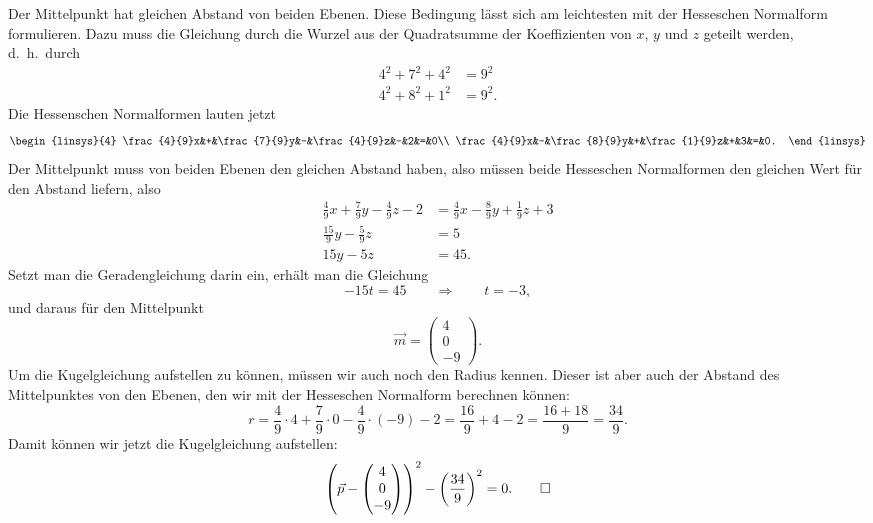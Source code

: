 \begin{loesung}
Der Mittelpunkt hat gleichen Abstand von beiden Ebenen. 
Diese Bedingung lässt sich am leichtesten mit der Hesseschen Normalform
formulieren.
Dazu muss die Gleichung durch die Wurzel aus der Quadratsumme der
Koeffizienten von $x$, $y$ und $z$ geteilt werden, d.~h.~durch
\begin{align*}
4^2+7^2+4^2&=9^2\\
4^2+8^2+1^2&=9^2.
\end{align*}
Die Hessenschen Normalformen lauten jetzt
\[
\begin{linsys}{4}
\frac{4}{9}x&+&\frac{7}{9}y&-&\frac{4}{9}z&-&2&=&0\\
\frac{4}{9}x&-&\frac{8}{9}y&+&\frac{1}{9}z&+&3&=&0.
\end{linsys}
\]
Der Mittelpunkt muss von beiden Ebenen den gleichen Abstand haben,
also müssen beide Hesseschen Normalformen den gleichen Wert für den Abstand
liefern, also
\begin{align*}
\frac{4}{9}x+\frac{7}{9}y-\frac{4}{9}z-2&=
\frac{4}{9}x-\frac{8}{9}y+\frac{1}{9}z+3
\\
\frac{15}{9}y-\frac{5}{9}z&=5
\\
15y-5z&=45.
\end{align*}
Setzt man die Geradengleichung darin ein, erhält man die Gleichung
\[
-15t=45
\qquad\Rightarrow\qquad t=-3,
\]
und daraus für den Mittelpunkt
\[
\vec m=\begin{pmatrix}4\\0\\-9\end{pmatrix}.
\]
Um die Kugelgleichung aufstellen zu können, müssen wir auch noch den
Radius kennen.
Dieser ist aber auch der Abstand des Mittelpunktes von den Ebenen,
den wir mit der Hesseschen Normalform berechnen können:
\[
r
=
\frac{4}{9}\cdot 4+\frac{7}{9}\cdot 0-\frac{4}{9}\cdot (-9)-2
=
\frac{16}{9}+4-2
=
\frac{16+18}{9}
=
\frac{34}{9}.
\]
Damit können wir jetzt die Kugelgleichung aufstellen:
\[
\left(
\vec p - \begin{pmatrix}4\\0\\-9\end{pmatrix}
\right)^2-\biggl(\frac{34}{9}\biggr)^2=0.
\qedhere
\]
\end{loesung}
